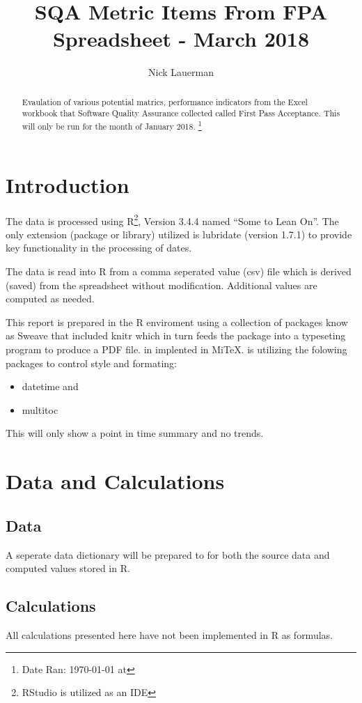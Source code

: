 \documentclass{article}
\title{SQA Metric Items From FPA Spreadsheet - March 2018}
\author{Nick Lauerman}
\date{}
\begin{document}

\maketitle

\begin{abstract}
Evaulation of various potential matrics, performance indicators from the Excel
workbook that Software Quality Assurance collected called First Pass
Acceptance. This will only be run for the month of January 2018.
\footnote{Date Ran: \today{} at \currenttime}
\end{abstract}

\tableofcontents

\section{Introduction}
The data is processed using R\footnote{RStudio is utilized as an IDE}, Version
3.4.4 named ``Some to Lean On''. The only extension (package or library) utilized is
lubridate (version 1.7.1) to provide key functionality in the processing of dates.

The data is read into R from a comma seperated value (csv) file which is derived (saved)
from the spreadsheet without modification. Additional values are computed as needed.

This report is prepared in the R enviroment using a collection of packages know as
Sweave that included knitr which in turn feeds the package into \LaTeXe{} a typeseting
program to produce a PDF file. \LaTeXe{} in implented in Mi\TeX. \LaTeXe{} is utilizing
the folowing packages to control style and formating:
\begin{itemize}
\item datetime and
\item multitoc
\end{itemize}

This will only show a point in time summary and no trends.

\section{Data and Calculations}
\subsection{Data}
A seperate data dictionary will be prepared to for both the source data
and computed values stored in R.

\subsection{Calculations}
All calculations presented here have not been implemented in R as formulas.
\end{document}
